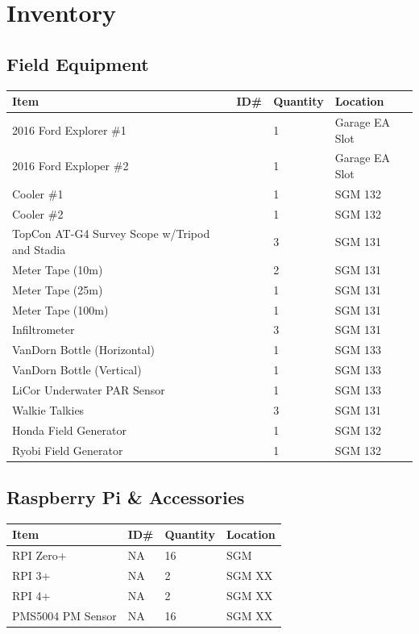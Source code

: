 \documentclass[12pt]{../SOP4_alpha}\usepackage[]{graphicx}\usepackage[]{xcolor}
\begin{document}


\section{Inventory}

\subsection{Field Equipment}

\begin{tabular}{|l|l|l|l|}
\hline
Item      & ID\#  & Quantity & Location \\ \hline
2016 Ford Explorer \#1 && 1 & Garage EA Slot \\
2016 Ford Exploper \#2  && 1 & Garage EA Slot \\
Cooler \#1        && 1 & SGM 132 \\
Cooler \#2        && 1 & SGM 132 \\
TopCon AT-G4 Survey Scope w/Tripod and Stadia  && 3 & SGM 131 \\
Meter Tape (10m)  && 2 & SGM 131 \\
Meter Tape (25m)  && 1 & SGM 131 \\
Meter Tape (100m) && 1 & SGM 131 \\
Infiltrometer     && 3 & SGM 131 \\
VanDorn Bottle (Horizontal) && 1 & SGM 133 \\
VanDorn Bottle (Vertical) && 1 & SGM 133 \\
LiCor Underwater PAR Sensor  && 1 & SGM 133 \\

Walkie Talkies && 3 & SGM 131 \\
Honda Field Generator  && 1 & SGM 132 \\
Ryobi Field Generator && 1 & SGM 132 \\
\hline
\end{tabular}

\subsection{Raspberry Pi \& Accessories}

\begin{tabular}{|l|l|l|l|}
\hline
Item        & ID\#  & Quantity  & Location \\ \hline
RPI Zero+   & NA    & 16        & SGM \\
RPI 3+      & NA    & 2         & SGM XX \\
RPI 4+      & NA    & 2         & SGM XX \\
PMS5004 PM Sensor & NA & 16     & SGM XX \\
\hline
\end{tabular}
\end{document}
